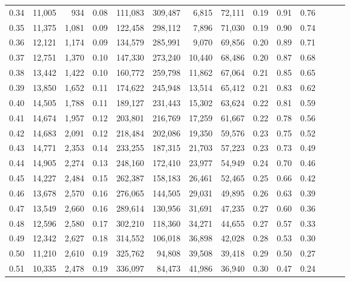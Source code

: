 \begin{tabular}{rrrrrrrrrrrrrr}
0.34 &  11,005 &    934 &  0.08 &  111,083 &  309,487 &   6,815 &  72,111 &  0.19 &  0.91 &      0.76 \\
0.35 &  11,375 &  1,081 &  0.09 &  122,458 &  298,112 &   7,896 &  71,030 &  0.19 &  0.90 &      0.74 \\
0.36 &  12,121 &  1,174 &  0.09 &  134,579 &  285,991 &   9,070 &  69,856 &  0.20 &  0.89 &      0.71 \\
0.37 &  12,751 &  1,370 &  0.10 &  147,330 &  273,240 &  10,440 &  68,486 &  0.20 &  0.87 &      0.68 \\
0.38 &  13,442 &  1,422 &  0.10 &  160,772 &  259,798 &  11,862 &  67,064 &  0.21 &  0.85 &      0.65 \\
0.39 &  13,850 &  1,652 &  0.11 &  174,622 &  245,948 &  13,514 &  65,412 &  0.21 &  0.83 &      0.62 \\
0.40 &  14,505 &  1,788 &  0.11 &  189,127 &  231,443 &  15,302 &  63,624 &  0.22 &  0.81 &      0.59 \\
0.41 &  14,674 &  1,957 &  0.12 &  203,801 &  216,769 &  17,259 &  61,667 &  0.22 &  0.78 &      0.56 \\
0.42 &  14,683 &  2,091 &  0.12 &  218,484 &  202,086 &  19,350 &  59,576 &  0.23 &  0.75 &      0.52 \\
0.43 &  14,771 &  2,353 &  0.14 &  233,255 &  187,315 &  21,703 &  57,223 &  0.23 &  0.73 &      0.49 \\
0.44 &  14,905 &  2,274 &  0.13 &  248,160 &  172,410 &  23,977 &  54,949 &  0.24 &  0.70 &      0.46 \\
0.45 &  14,227 &  2,484 &  0.15 &  262,387 &  158,183 &  26,461 &  52,465 &  0.25 &  0.66 &      0.42 \\
0.46 &  13,678 &  2,570 &  0.16 &  276,065 &  144,505 &  29,031 &  49,895 &  0.26 &  0.63 &      0.39 \\
0.47 &  13,549 &  2,660 &  0.16 &  289,614 &  130,956 &  31,691 &  47,235 &  0.27 &  0.60 &      0.36 \\
0.48 &  12,596 &  2,580 &  0.17 &  302,210 &  118,360 &  34,271 &  44,655 &  0.27 &  0.57 &      0.33 \\
0.49 &  12,342 &  2,627 &  0.18 &  314,552 &  106,018 &  36,898 &  42,028 &  0.28 &  0.53 &      0.30 \\
0.50 &  11,210 &  2,610 &  0.19 &  325,762 &   94,808 &  39,508 &  39,418 &  0.29 &  0.50 &      0.27 \\
0.51 &  10,335 &  2,478 &  0.19 &  336,097 &   84,473 &  41,986 &  36,940 &  0.30 &  0.47 &      0.24 \\

\end{tabular}

